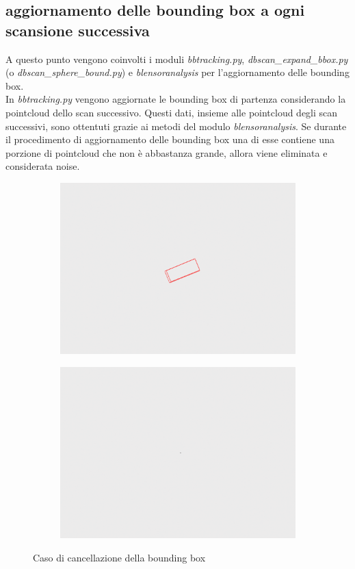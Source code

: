 \documentclass[italian]{article}
\begin{document}
\subsection{aggiornamento delle bounding box a ogni scansione successiva}
A questo punto vengono coinvolti i moduli \textit{bbtracking.py}, \textit{dbscan\_expand\_bbox.py} (o \textit{dbscan\_sphere\_bound.py}) e \textit{blensoranalysis} per l'aggiornamento delle bounding box.\\
In \textit{bbtracking.py} vengono aggiornate le bounding box di partenza considerando la pointcloud dello scan successivo. Questi dati, insieme alle pointcloud degli scan successivi, sono ottentuti grazie ai metodi del modulo \textit{blensoranalysis}. Se durante il procedimento di aggiornamento delle bounding box una di esse contiene una porzione di pointcloud che non è abbastanza grande, allora viene eliminata e considerata noise.\\
\begin{figure}[H]
	\centering
	\begin{subfigure}{0.45\textwidth}
		\includegraphics[width=\textwidth]{bb}
	\end{subfigure}
	\begin{subfigure}{0.45\textwidth}
		\includegraphics[width=\textwidth]{nobb}
	\end{subfigure}
	\footnotesize
	\caption{Caso di cancellazione della bounding box}
\end{figure}
\end{document}
